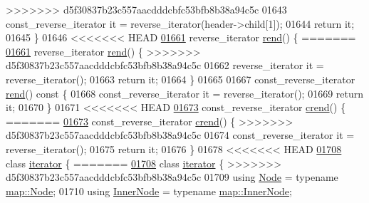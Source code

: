 \begin{DoxyCode}
>>>>>>> d5f30837b23c557aacdddcbfc53bfb8b38a94c5c
01643         const\_reverse\_iterator it = reverse\_iterator(header->child[1]);
01644         \textcolor{keywordflow}{return} it;
01645     \}
01646 
<<<<<<< HEAD
\hypertarget{map2_8h_source_l01661}{}\hyperlink{namespaceaed2_a161376ee8d17855224ab722ff9e0dd9a_a161376ee8d17855224ab722ff9e0dd9a}{01661}     reverse\_iterator \hyperlink{namespaceaed2_a161376ee8d17855224ab722ff9e0dd9a_a161376ee8d17855224ab722ff9e0dd9a}{rend}() \{
=======
\hyperlink{namespaceaed2_a161376ee8d17855224ab722ff9e0dd9a_a161376ee8d17855224ab722ff9e0dd9a}{01661}     reverse\_iterator \hyperlink{namespaceaed2_a161376ee8d17855224ab722ff9e0dd9a_a161376ee8d17855224ab722ff9e0dd9a}{rend}() \{
>>>>>>> d5f30837b23c557aacdddcbfc53bfb8b38a94c5c
01662         reverse\_iterator it = reverse\_iterator();
01663         \textcolor{keywordflow}{return} it;
01664     \}
01665 
01667     const\_reverse\_iterator \hyperlink{namespaceaed2_a161376ee8d17855224ab722ff9e0dd9a_a161376ee8d17855224ab722ff9e0dd9a}{rend}()\textcolor{keyword}{ const }\{
01668         const\_reverse\_iterator it = reverse\_iterator();
01669         \textcolor{keywordflow}{return} it;
01670     \}
01671 
<<<<<<< HEAD
\hypertarget{map2_8h_source_l01673}{}\hyperlink{namespaceaed2_a3f4649ed2b93f1fdb07419fa1de0bf7f_a3f4649ed2b93f1fdb07419fa1de0bf7f}{01673}     const\_reverse\_iterator \hyperlink{namespaceaed2_a3f4649ed2b93f1fdb07419fa1de0bf7f_a3f4649ed2b93f1fdb07419fa1de0bf7f}{crend}() \{
=======
\hyperlink{namespaceaed2_a3f4649ed2b93f1fdb07419fa1de0bf7f_a3f4649ed2b93f1fdb07419fa1de0bf7f}{01673}     const\_reverse\_iterator \hyperlink{namespaceaed2_a3f4649ed2b93f1fdb07419fa1de0bf7f_a3f4649ed2b93f1fdb07419fa1de0bf7f}{crend}() \{
>>>>>>> d5f30837b23c557aacdddcbfc53bfb8b38a94c5c
01674         const\_reverse\_iterator it = reverse\_iterator();
01675         \textcolor{keywordflow}{return} it;
01676     \}
01678 
<<<<<<< HEAD
\hypertarget{map2_8h_source_l01708}{}\hyperlink{classaed2_1_1iterator}{01708}     \textcolor{keyword}{class }\hyperlink{classaed2_1_1iterator_1_1iterator}{iterator} \{
=======
\hyperlink{classaed2_1_1iterator}{01708}     \textcolor{keyword}{class }\hyperlink{classaed2_1_1iterator_1_1iterator}{iterator} \{
>>>>>>> d5f30837b23c557aacdddcbfc53bfb8b38a94c5c
01709         \textcolor{keyword}{using} \hyperlink{structaed2_1_1iterator_1_1Node}{Node} = \textcolor{keyword}{typename} \hyperlink{structaed2_1_1map_1_1Node}{map::Node};
01710         \textcolor{keyword}{using} \hyperlink{structaed2_1_1iterator_1_1InnerNode}{InnerNode} = \textcolor{keyword}{typename} \hyperlink{structaed2_1_1map_1_1InnerNode}{map::InnerNode};

\end{DoxyCode}
